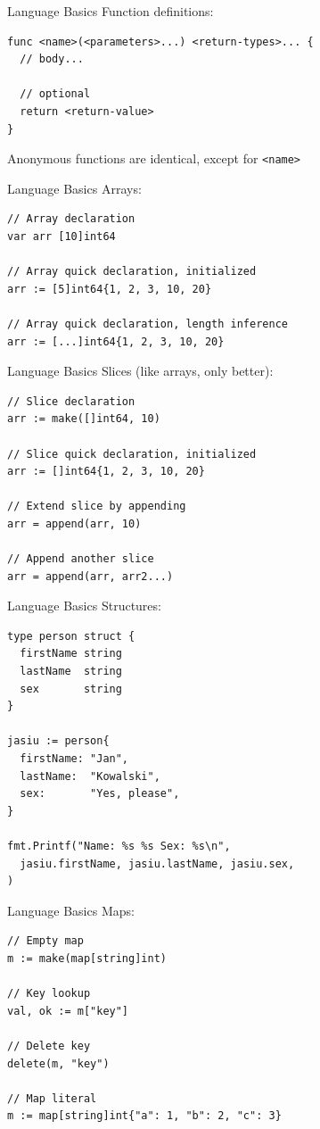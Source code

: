\documentclass[pdf,xcolor=dvipsnames,noparindent]{beamer}
\begin{document}
\begin{frame}[fragile]{Language Basics}
  Function definitions:
  \pause
  \begin{verbatim}
func <name>(<parameters>...) <return-types>... {
  // body... 
  
  // optional
  return <return-value>
}
\end{verbatim}
  \pause
  Anonymous functions are identical, except for \texttt{<name>}
\end{frame}

\begin{frame}[fragile]{Language Basics}
  Arrays:
  \pause
\begin{verbatim}
// Array declaration
var arr [10]int64

// Array quick declaration, initialized
arr := [5]int64{1, 2, 3, 10, 20}

// Array quick declaration, length inference
arr := [...]int64{1, 2, 3, 10, 20}
\end{verbatim}
\end{frame}

\begin{frame}[fragile]{Language Basics}
  Slices (like arrays, only better):
  \pause
\begin{verbatim}
// Slice declaration
arr := make([]int64, 10)

// Slice quick declaration, initialized
arr := []int64{1, 2, 3, 10, 20}

// Extend slice by appending
arr = append(arr, 10)

// Append another slice
arr = append(arr, arr2...)
\end{verbatim}
\end{frame}

\begin{frame}[fragile]{Language Basics}
  Structures:
  \pause
\begin{verbatim}
type person struct {
  firstName string
  lastName  string
  sex       string
}

jasiu := person{
  firstName: "Jan",
  lastName:  "Kowalski",
  sex:       "Yes, please",
}

fmt.Printf("Name: %s %s Sex: %s\n",
  jasiu.firstName, jasiu.lastName, jasiu.sex,
)
\end{verbatim}
\end{frame}

\begin{frame}[fragile]{Language Basics}
  Maps:
  \pause
\begin{verbatim}
// Empty map
m := make(map[string]int)

// Key lookup
val, ok := m["key"]

// Delete key
delete(m, "key")

// Map literal
m := map[string]int{"a": 1, "b": 2, "c": 3}
\end{verbatim}
\end{frame}
\end{document}
